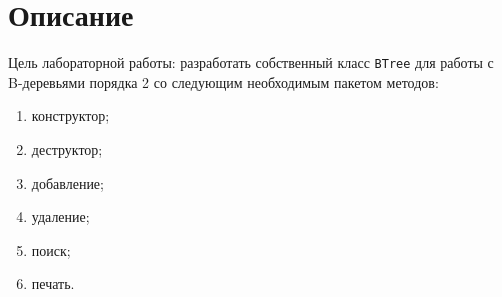 \section{Описание}


Цель лабораторной работы: разработать собственный класс \texttt{BTree} для работы с B-деревьями порядка 2 со следующим необходимым пакетом методов:
\begin{enumerate}
    \item конструктор;
    \item деструктор;
    \item добавление;
    \item удаление;
    \item поиск;
    \item печать.
\end{enumerate}

\newpage